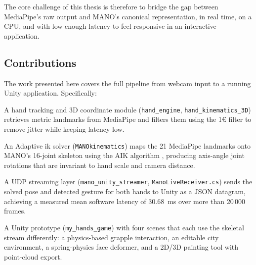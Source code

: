The core challenge of this thesis is therefore to bridge the gap between
MediaPipe's raw output and MANO's canonical representation, in real time,
on a CPU, and with low enough latency to feel responsive in an interactive
application.

\subsection{Contributions}\label{subsec:contributions}

The work presented here covers the full pipeline from webcam input to
a running Unity application. Specifically:

A hand tracking and 3D coordinate module (\texttt{hand\_engine},
\texttt{hand\_kinematics\_3D}) retrieves metric landmarks from MediaPipe
and filters them using the 1\euro{} filter \cite{casiez2012oneeuro} to remove
jitter while keeping latency low.

An Adaptive \acrshort{ik} solver (\texttt{MANOkinematics}) maps the 21
MediaPipe landmarks onto MANO's 16-joint skeleton using the AIK algorithm
\cite{meng2021aik}, producing axis-angle joint rotations that are invariant
to hand scale and camera distance.

A UDP streaming layer (\texttt{mano\_unity\_streamer},
\texttt{ManoLiveReceiver.cs}) sends the solved pose and detected gesture
for both hands to Unity as a JSON datagram, achieving a measured mean
software latency of \SI{30.68}{\ms} over more than 20\,000 frames.

A Unity prototype (\texttt{my\_hands\_game}) with four scenes that each
use the skeletal stream differently: a physics-based grapple interaction,
an editable city environment, a spring-physics face deformer, and a 2D/3D
painting tool with point-cloud export.
